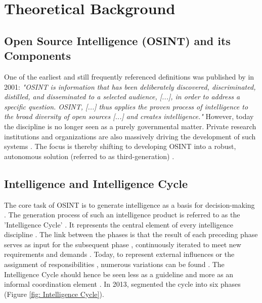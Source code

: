 \documentclass[10pt]{article}
\begin{document}
\section{Theoretical Background} \label{sec:theoreticalbackground}


\subsection{Open Source Intelligence (OSINT) and its Components}

One of the earliest and still frequently referenced definitions \cite{DosPassos.2017}
was published by \cite{NorthAtlanticTreatyOrganization.2001} in 2001: \textit{"OSINT is information that has been
    deliberately discovered, discriminated, distilled, and disseminated to a selected audience,
    [...], in order to address a specific question. OSINT, [...] thus applies the proven
    process of intelligence to the broad diversity of open sources [...] and creates
    intelligence."} However, today the discipline is no longer seen as a purely governmental
matter. Private research institutions and organizations \cite{Bohm.2021,Mercado.2005} are
also massively driving the development of such systems
\cite{Dokman.2020, Ghioni.2023}. The focus is thereby shifting to
developing OSINT into a robust, autonomous solution (referred to as third-generation) \cite{PastorGalindo.2019}.

\subsection{Intelligence and Intelligence Cycle}

The core task of OSINT is to generate intelligence as a basis for decision-making
\cite{Breakspear.2013,NorthAtlanticTreatyOrganization.2001}. The generation process of such an intelligence product
is referred to as the 'Intelligence Cycle' \cite{CentralIntelligenceAgency.1987}.
It represents the central element of every intelligence discipline \cite{Reuser.2017}.
The link between the phases is that the result of each preceding phase serves as input for the subsequent phase \cite{JointChiefsofStaffU.S.Army.2013}, continuously iterated to meet new requirements and demands \cite{Gibson.2016}.
Today, to represent external influences or the assignment of responsibilities \cite{Lowenthal.2020,Phythian.2013}, numerous
variations can be found \cite{Reuser.2017}. The Intelligence Cycle should hence be seen less as a guideline and more as an informal
coordination element \cite{Hwang.2022}. In 2013, \cite{JointChiefsofStaffU.S.Army.2013} segmented the cycle into six phases  (Figure \ref{fig: Intelligence Cycle}).
\end{document}
